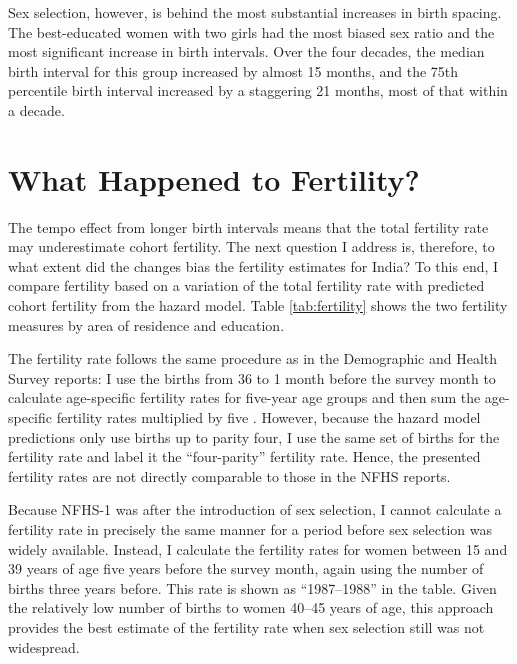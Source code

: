 \documentclass[12pt,letterpaper]{article}
\begin{document}
Sex selection, however, is behind the most substantial increases in birth spacing. 
The best-educated women with two girls had the most biased sex ratio and the most 
significant increase in birth intervals. 
Over the four decades, the median birth interval for this group increased by almost 15 
months, 
and the 75th percentile birth interval increased by a staggering 21 months, most of that 
within a decade.

\section{What Happened to Fertility?\label{sec:fertility}}

The tempo effect from longer birth intervals means that the total fertility rate may 
underestimate cohort fertility. 
The next question I address is, therefore, to what extent did the changes bias the 
fertility estimates for India? 
To this end, I compare fertility based on a variation of the total fertility rate with 
predicted cohort fertility from the hazard model.
Table \ref{tab:fertility} shows the two fertility measures by area of residence and education.



The fertility rate follows the same procedure as in the Demographic and Health Survey 
reports: I use the births from 36 to 1 month before the survey month to calculate 
age-specific fertility rates for five-year age groups and then sum the age-specific 
fertility rates multiplied by five  \citep{Croft2018}.
However, because the hazard model predictions only use births up to parity four, I use the 
same set of births for the fertility rate and label it the ``four-parity'' fertility rate. 
Hence, the presented fertility rates are not directly comparable to those in the NFHS reports.

%

Because NFHS-1 was after the introduction of sex selection, I cannot calculate a fertility 
rate in precisely the same manner for a period before sex selection was widely available.
Instead, I calculate the fertility rates for women between 15 and 39 years of age five years 
before the survey month, again using the number of births three years before.
This rate is shown as ``1987--1988'' in the table.
Given the relatively low number of births to women 40--45 years of age, this approach 
provides the best estimate of the fertility rate when sex selection still was not 
widespread.
\end{document}
